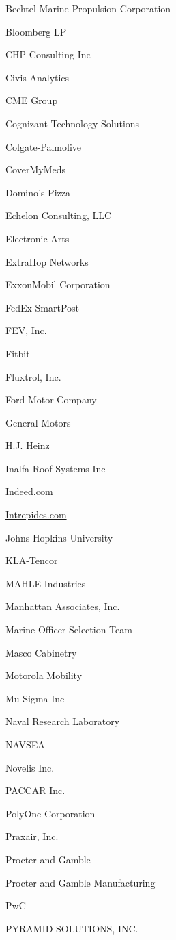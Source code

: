 \documentclass[twoside]{article}
\begin{document}
\begin{center}
\begin{multicols}{5}
\begin{FlushLeft}
\begin{compactitem}
\item Bechtel Marine Propulsion Corporation
\item Bloomberg LP
\item CHP Consulting Inc
\item Civis Analytics
\item CME Group
\item Cognizant Technology Solutions
\item Colgate-Palmolive
\item CoverMyMeds
\item Domino's Pizza
\item Echelon Consulting, LLC
\item Electronic Arts
\item ExtraHop Networks
\item ExxonMobil Corporation
\item FedEx SmartPost
\item FEV, Inc.
\item Fitbit
\item Fluxtrol, Inc.
\item Ford Motor Company
\item General Motors
\item H.J. Heinz
\item Inalfa Roof Systems Inc
\item \url{Indeed.com}
\item \url{Intrepidcs.com}
\item Johns Hopkins University
\item KLA-Tencor
\item MAHLE Industries
\item Manhattan Associates, Inc.
\item Marine Officer Selection Team
\item Masco Cabinetry
\item Motorola Mobility
\item Mu Sigma Inc
\item Naval Research Laboratory
\item NAVSEA
\item Novelis Inc.
\item PACCAR Inc.
\item PolyOne Corporation
\item Praxair, Inc.
\item Procter and Gamble
\item Procter and Gamble Manufacturing
\item PwC
\item PYRAMID SOLUTIONS, INC.

\end{compactitem}
\end{FlushLeft}
\end{multicols}
\end{center}
\end{document}

